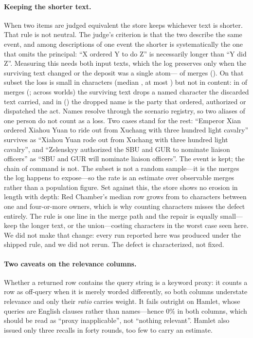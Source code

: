 \documentclass{article}
\begin{document}
\paragraph{Keeping the shorter text.} When two items are judged equivalent the
store keeps whichever text is shorter. That rule is not neutral. The judge's
criterion is that the two describe the same event, and among descriptions of one
event the shorter is systematically the one that omits the principal: ``X ordered
Y to do Z'' is necessarily longer than ``Y did Z''. Measuring this needs both
input texts, which the log preserves only when the surviving text changed or the
deposit was a single atom---\MergeRecov{} of \MergeTotal{} merges (\MergeCov{}).
On that subset the loss is small in characters (median \MergeChars{}, at most
\MergeCharsMax{}) but not in content: in \MergeLossN{} of \MergeRecov{} merges
(\MergeLossPct{}; \MergeLossRange{} across worlds) the surviving text drops a
named character the discarded text carried, and in \MergePrincN{}
(\MergePrincPct{}) the dropped name is the party that ordered, authorized or
dispatched the act. Names resolve through the scenario registry, so two aliases
of one person do not count as a loss. Two cases stand for the rest: ``Emperor
Xian ordered Xiahou Yuan to ride out from Xuchang with three hundred light
cavalry'' survives as ``Xiahou Yuan rode out from Xuchang with three hundred
light cavalry'', and ``Zelenskyy authorized the SBU and GUR to nominate liaison
officers'' as ``SBU and GUR will nominate liaison officers''. The event is kept;
the chain of command is not. The subset is not a random sample---it is the
merges the log happens to expose---so the rate is an estimate over observable
merges rather than a population figure. Set against this, the store shows no
erosion in length with depth: Red Chamber's median row grows from \LenRcLow{}
to \LenRcHigh{} characters between one and four-or-more owners, which is why
counting characters misses the defect entirely. The rule is one line in the
merge path and the repair is equally small---keep the longer text, or the
union---costing \MergeCharsMax{} characters in the worst case seen here. We did
not make that change: every run reported here was produced under the shipped
rule, and we did not rerun. The defect is characterized, not fixed.

\paragraph{Two caveats on the relevance columns.} Whether a returned row
contains the query string is a keyword proxy: it counts a row as off-query when
it is merely worded differently, so both columns understate relevance and only
their \emph{ratio} carries weight. It fails outright on Hamlet, whose queries
are English clauses rather than names---hence \(0\%\) in both columns, which
should be read as ``proxy inapplicable'', not ``nothing relevant''. Hamlet also
issued only three recalls in forty rounds, too few to carry an estimate.
\end{document}
